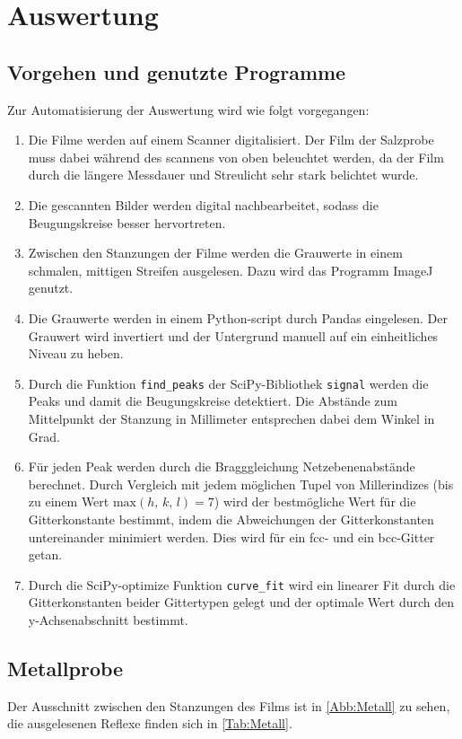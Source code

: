 \section{Auswertung}
\subsection{Vorgehen und genutzte Programme}
Zur Automatisierung der Auswertung wird wie folgt vorgegangen:
\begin{enumerate}
  \item Die Filme werden auf einem Scanner digitalisiert.
  Der Film der Salzprobe muss dabei während des scannens von oben beleuchtet werden,
  da der Film durch die längere Messdauer und Streulicht sehr stark belichtet
  wurde.
  \item Die gescannten Bilder werden digital nachbearbeitet, sodass die
  Beugungskreise besser hervortreten.
  \item Zwischen den Stanzungen der Filme werden die Grauwerte in einem schmalen,
  mittigen Streifen ausgelesen.
  Dazu wird das Programm ImageJ\cite{Schneider2012} genutzt.
  \item Die Grauwerte werden in einem Python\cite{python}-script
  durch Pandas\cite{mckinney-proc-scipy-2010} eingelesen.
  Der Grauwert wird invertiert und der Untergrund manuell auf ein
  einheitliches Niveau zu heben.
  \item Durch die Funktion \texttt{find\_peaks} der SciPy\cite{scipy}-Bibliothek
  \texttt{signal} werden die Peaks und damit die Beugungskreise detektiert.
  Die Abstände zum Mittelpunkt der Stanzung in Millimeter entsprechen dabei
  dem Winkel in Grad.
  \item Für jeden Peak werden durch die Bragggleichung Netzebenenabstände
  berechnet. Durch Vergleich mit jedem möglichen Tupel von Millerindizes
  (bis zu einem Wert $\text{max}(h, \, k, \, l) = 7$) wird der bestmögliche
  Wert für die Gitterkonstante bestimmt, indem die Abweichungen der Gitterkonstanten
  untereinander minimiert werden. Dies wird für ein fcc- und ein bcc-Gitter getan.
  \item Durch die SciPy-optimize Funktion \texttt{curve\_fit} wird ein linearer
  Fit durch die Gitterkonstanten beider Gittertypen gelegt und der optimale Wert
  durch den y-Achsenabschnitt bestimmt.
\end{enumerate}

\subsection{Metallprobe}
Der Ausschnitt zwischen den Stanzungen des Films ist in \autoref{Abb:Metall}
zu sehen, die ausgelesenen Reflexe finden sich in \autoref{Tab:Metall}.

